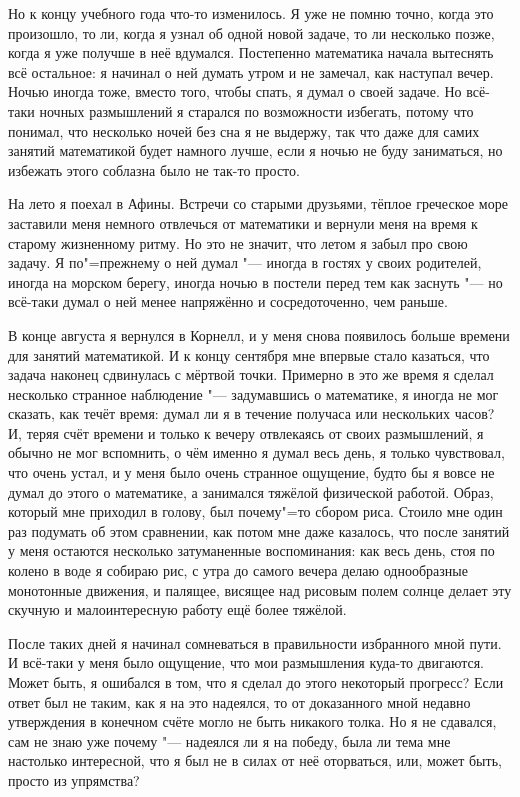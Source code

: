 Но к концу учебного года что-то изменилось.
Я уже не помню точно, когда это произошло, то ли, когда я узнал об одной новой
задаче, то ли несколько позже, когда я уже получше в неё вдумался.
Постепенно математика начала вытеснять всё остальное: я начинал о ней думать
утром и не замечал, как наступал вечер.
Ночью иногда тоже, вместо того, чтобы спать, я думал о своей задаче.
Но всё-таки ночных размышлений я старался по возможности избегать, потому что
понимал, что несколько ночей без сна я не выдержу, так что даже для самих
занятий математикой будет намного лучше, если я ночью не буду заниматься, но
избежать этого соблазна было не так-то просто.

На лето я поехал в Афины.
Встречи со старыми друзьями, тёплое греческое море заставили меня немного
отвлечься от математики и вернули меня на время к старому жизненному ритму.
Но это не значит, что летом я забыл про свою задачу.
Я по"=прежнему о ней думал "--- иногда в гостях у своих родителей, иногда на
морском берегу, иногда ночью в постели перед тем как заснуть "--- но всё-таки
думал о ней менее напряжённо и сосредоточенно, чем раньше.

В конце августа я вернулся в Корнелл, и у меня снова появилось больше времени
для занятий математикой.
И к концу сентября мне впервые стало казаться, что задача наконец сдвинулась с
мёртвой точки.
Примерно в это же время я сделал несколько странное наблюдение "--- задумавшись
о математике, я иногда не мог сказать, как течёт время: думал ли я в течение
получаса или нескольких часов?
И, теряя счёт времени и только к вечеру отвлекаясь от своих размышлений, я
обычно не мог вспомнить, о чём именно я думал весь день, я только чувствовал,
что очень устал, и у меня было очень странное ощущение, будто бы я вовсе не
думал до этого о математике, а занимался тяжёлой физической работой.
Образ, который мне приходил в голову, был почему"=то сбором риса.
Стоило мне один раз подумать об этом сравнении, как потом мне даже казалось, что
после занятий у меня остаются несколько затуманенные воспоминания: как весь день,
стоя по колено в воде я собираю рис, с утра до самого вечера делаю однообразные
монотонные движения, и палящее, висящее над рисовым полем солнце делает эту
скучную и малоинтересную работу ещё более тяжёлой.

После таких дней я начинал сомневаться в правильности избранного мной пути.
И всё-таки у меня было ощущение, что мои размышления куда-то двигаются.
Может быть, я ошибался в том, что я сделал до этого некоторый прогресс?
Если ответ был не таким, как я на это надеялся, то от доказанного мной недавно
утверждения в конечном счёте могло не быть никакого толка.
Но я не сдавался, сам не знаю уже почему "--- надеялся ли я на победу, была ли
тема мне настолько интересной, что я был не в силах от неё оторваться, или,
может быть, просто из упрямства?


